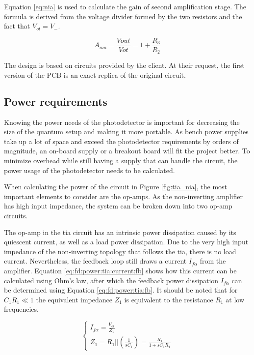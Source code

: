 Equation \eqref{eq:nia} is used to calculate the gain of second amplification stage. The formula is derived from the voltage divider formed by the two resistors and the fact that $V_{ot} = V_{-}$.

\begin{equation}\label{eq:nia}
	A_{nia} = \frac{V{out}}{V{ot}} = 1 + \frac{R_3}{R_2}
\end{equation}

The design is based on circuits provided by the client. At their request, the first version of the PCB is an exact replica of the original circuit.  

\subsection{Power requirements}\label{chap:fd:power_req}
Knowing the power needs of the photodetector is important for decreasing the size of the quantum setup and making it more portable. As bench power supplies take up a lot of space and exceed the photodetector requirements by orders of magnitude, an on-board supply or a breakout board will fit the project better. To minimize overhead while still having a supply that can handle the circuit, the power usage of the photodetector needs to be calculated. 

When calculating the power of the circuit in Figure \ref{fig:tia_nia}, the most important elements to consider are the op-amps. As the non-inverting amplifier has high input impedance, the system can be broken down into two op-amp circuits.

The op-amp in the \gls{tia} circuit has an intrinsic power dissipation caused by its quiescent current, as well as a load power dissipation. Due to the very high input impedance of the non-inverting topology that follows the \gls{tia}, there is no load current. Nevertheless, the feedback loop still draws a current $I_{f\alpha}$ from the amplifier. Equation \eqref{eq:fd:power:tia:current:fb} shows how this current can be calculated using Ohm's law, after which the feedback power dissipation $I_{f\alpha}$ can be determined using Equation \eqref{eq:fd:power:tia:fb}. It should be noted that for $C_1R_1 \ll 1$ the equivalent impedance $Z_1$ is equivalent to the resistance $R_1$ at low frequencies.

\begin{equation}\label{eq:fd:power:tia:current:fb}
	\begin{cases}
		I_{f\alpha} = \frac{V_{ot}}{Z_1}\\
		Z_1 = R_1||(\frac{1}{sC_1}) = \frac{R_1}{1 + sC_1R_1}
	\end{cases}
\end{equation}

